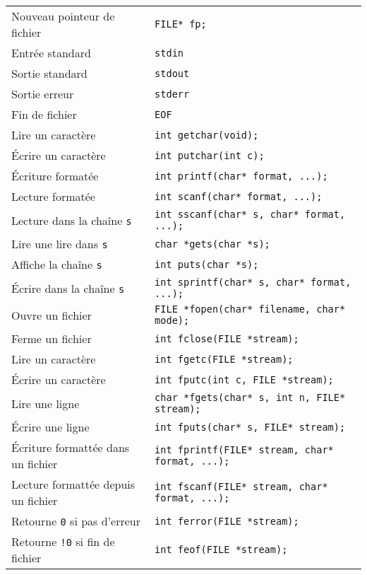 \documentclass{article}
\newcommand{\cd}{\lstinline}
\begin{document}
\begin{multicols*}{3}
\begin{tabularx}{\linewidth}{Xl}
  Nouveau pointeur de fichier & \cd{FILE* fp;} \\
  Entrée standard & \cd{stdin} \\
  Sortie standard & \cd{stdout} \\
  Sortie erreur & \cd{stderr} \\
  Fin de fichier & \cd{EOF} \rule{0pt}{3ex} \\
  Lire un caractère & \cd{int getchar(void);} \rule{0pt}{3ex} \\
  Écrire un caractère & \cd{int putchar(int c);} \\
  Écriture formatée & \cd{int printf(char* format, ...);} \\
  Lecture formatée & \cd{int scanf(char* format, ...);} \\
  Lecture dans la chaîne \texttt{s} & \cd{int sscanf(char* s, char* format, ...);} \\
  Lire une lire dans \texttt{s} & \cd{char *gets(char *s);} \\
  Affiche la chaîne \texttt{s} & \cd{int puts(char *s);} \\

  Écrire dans la chaîne \texttt{s} & \cd{int sprintf(char* s, char* format, ...);} \rule{0pt}{3ex} \\

  Ouvre un fichier & \cd{FILE *fopen(char* filename, char* mode);} \\
  Ferme un fichier & \cd{int fclose(FILE *stream);} \\
  Lire un caractère & \cd{int fgetc(FILE *stream);} \\
  Écrire un caractère & \cd{int fputc(int c, FILE *stream);} \\

  Lire une ligne & \cd{char *fgets(char* s, int n, FILE* stream);} \rule{0pt}{3ex} \\
  Écrire une ligne & \cd{int fputs(char* s, FILE* stream);} \\

  Écriture formattée dans un fichier & \cd{int fprintf(FILE* stream, char* format, ...);} \rule{0pt}{3ex} \\
  Lecture formattée depuis un fichier & \cd{int fscanf(FILE* stream, char* format, ...);} \\

  Retourne \cd{0} si pas d'erreur & \cd{int ferror(FILE *stream);} \rule{0pt}{3ex} \\
  Retourne \cd{!0} si fin de fichier & \cd{int feof(FILE *stream);}
\end{tabularx}


\end{multicols*}
\end{document}
